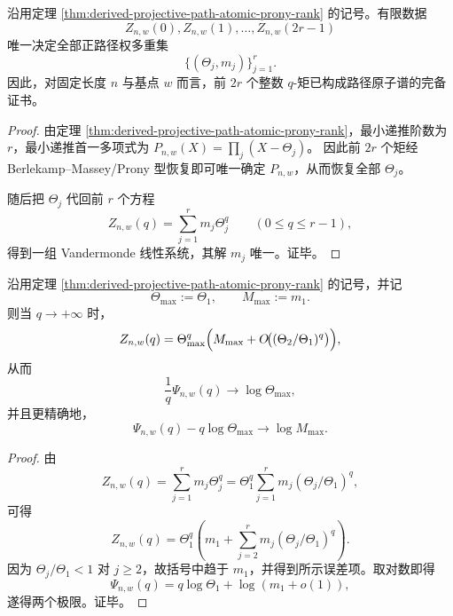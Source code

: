 \begin{corollary}[前 \(2r\) 个整数矩完全恢复固定长度路径权多重集]\label{cor:derived-projective-path-2r-moments-recover-spectrum}
沿用定理 \ref{thm:derived-projective-path-atomic-prony-rank} 的记号。有限数据
\[
Z_{n,w}(0),Z_{n,w}(1),\dots,Z_{n,w}(2r-1)
\]
唯一决定全部正路径权多重集
\[
\{(\Theta_j,m_j)\}_{j=1}^{r}.
\]
因此，对固定长度 \(n\) 与基点 \(w\) 而言，前 \(2r\) 个整数 \(q\)-矩已构成路径原子谱的完备证书。
\end{corollary}

\begin{proof}
由定理 \ref{thm:derived-projective-path-atomic-prony-rank}，最小递推阶数为 \(r\)，最小递推首一多项式为
\(
P_{n,w}(X)=\prod_j(X-\Theta_j)
\)。
因此前 \(2r\) 个矩经 Berlekamp--Massey/Prony 型恢复即可唯一确定 \(P_{n,w}\)，从而恢复全部 \(\Theta_j\)。

随后把 \(\Theta_j\) 代回前 \(r\) 个方程
\[
Z_{n,w}(q)=\sum_{j=1}^{r}m_j\Theta_j^q
\qquad(0\le q\le r-1),
\]
得到一组 Vandermonde 线性系统，其解 \(m_j\) 唯一。证毕。
\end{proof}

\begin{theorem}\label{thm:derived-projective-path-maxplus-intercept}
沿用定理 \ref{thm:derived-projective-path-atomic-prony-rank} 的记号，并记
\[
\Theta_{\max}:=\Theta_1,
\qquad
M_{\max}:=m_1.
\]
则当 \(q\to+\infty\) 时，
\[
Z_{n,w}(q)
=
\Theta_{\max}^q
\Bigl(
M_{\max}
+
O\!\bigl((\Theta_2/\Theta_1)^q\bigr)
\Bigr),
\]
从而
\[
\frac{1}{q}\Psi_{n,w}(q)\longrightarrow \log\Theta_{\max},
\]
并且更精确地，
\[
\Psi_{n,w}(q)-q\log\Theta_{\max}\longrightarrow \log M_{\max}.
\]
\end{theorem}

\begin{proof}
由
\[
Z_{n,w}(q)=\sum_{j=1}^{r}m_j\Theta_j^q
=
\Theta_1^q\sum_{j=1}^{r}m_j(\Theta_j/\Theta_1)^q,
\]
可得
\[
Z_{n,w}(q)
=
\Theta_1^q
\left(
m_1+\sum_{j=2}^{r}m_j(\Theta_j/\Theta_1)^q
\right).
\]
因为 \(\Theta_j/\Theta_1<1\) 对 \(j\ge 2\)，故括号中趋于 \(m_1\)，并得到所示误差项。取对数即得
\[
\Psi_{n,w}(q)=q\log\Theta_1+\log(m_1+o(1)),
\]
遂得两个极限。证毕。
\end{proof}

